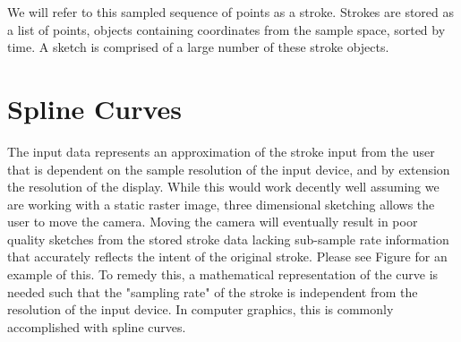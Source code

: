 We will refer to this sampled sequence of points as a stroke. 
Strokes are stored as a list of points, objects containing coordinates from the sample space, sorted by time.
A sketch is comprised of a large number of these stroke objects.

\section{Spline Curves}

The input data represents an approximation of the stroke input from the user that is dependent on the sample resolution of the input device, and by extension the resolution of the display.
While this would work decently well assuming we are working with a static raster image, three dimensional sketching allows the user to move the camera.
Moving the camera will eventually result in poor quality sketches from the stored stroke data lacking sub-sample rate information that accurately reflects the intent of the original stroke.
Please see Figure for an example of this.
To remedy this, a mathematical representation of the curve is needed such that the "sampling rate" of the stroke is independent from the resolution of the input device.
In computer graphics, this is commonly accomplished with spline curves.

